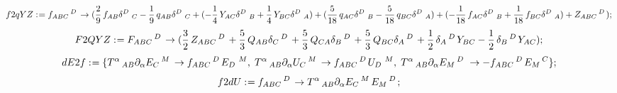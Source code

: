 \documentclass[11pt]{article}
\def\specialcolon{\mathrel{\mathop{:}}\hspace{-.5em}}
\begin{document}
\begin{dmath*}[compact, spread=2pt]
f2qYZ\specialcolon{}= {f}_{A B C}\,^{D\, } \rightarrow (\frac{2}{9}\, {f}_{A B} {\delta}^{D\, }\,_{C} - \frac{1}{9}\, {q}_{A B} {\delta}^{D\, }\,_{C} + ( - \frac{1}{4}\, {Y}_{A C} {\delta}^{D\, }\,_{B} + \frac{1}{4}\, {Y}_{B C} {\delta}^{D\, }\,_{A}) + (\frac{5}{18}\, {q}_{A C} {\delta}^{D\, }\,_{B} - \frac{5}{18}\, {q}_{B C} {\delta}^{D\, }\,_{A}) + ( - \frac{1}{18}\, {f}_{A C} {\delta}^{D\, }\,_{B} + \frac{1}{18}\, {f}_{B C} {\delta}^{D\, }\,_{A}) + {Z}_{A B C}\,^{D\, });
\end{dmath*}
\begin{dmath*}[compact, spread=2pt]
F2QYZ\specialcolon{}= {F}_{A B C}\,^{D\, } \rightarrow (\frac{3}{2}\, {Z}_{A B C}\,^{D\, } + \frac{5}{3}\, {Q}_{A B} {\delta}_{C}\,^{D\, } + \frac{5}{3}\, {Q}_{C A} {\delta}_{B}\,^{D\, } + \frac{5}{3}\, {Q}_{B C} {\delta}_{A}\,^{D\, } + \frac{1}{2}\, {\delta}_{A}\,^{D\, } {Y}_{B C} - \frac{1}{2}\, {\delta}_{B}\,^{D\, } {Y}_{A C});
\end{dmath*}
\begin{dmath*}[compact, spread=2pt]
dE2f\specialcolon{}= \{{T}^{\alpha}\,_{A B} {\partial}_{\alpha}{{E}_{C}\,^{M}}\,  \rightarrow {f}_{A B C}\,^{D\, } {E}_{D\, }\,^{M},\; {T}^{\alpha}\,_{A B} {\partial}_{\alpha}{{U}_{C}\,^{M}}\,  \rightarrow {f}_{A B C}\,^{D\, } {U}_{D\, }\,^{M},\; {T}^{\alpha}\,_{A B} {\partial}_{\alpha}{{E}_{M}\,^{D\, }}\,  \rightarrow -{f}_{A B C}\,^{D\, } {E}_{M}\,^{C}\};
\end{dmath*}
\begin{dmath*}[compact, spread=2pt]
f2dU\specialcolon{}= {f}_{A B C}\,^{D\, } \rightarrow {T}^{\alpha}\,_{A B} {\partial}_{\alpha}{{E}_{C}\,^{M}}\,  {E}_{M}\,^{D\, };
\end{dmath*}
\end{document}
